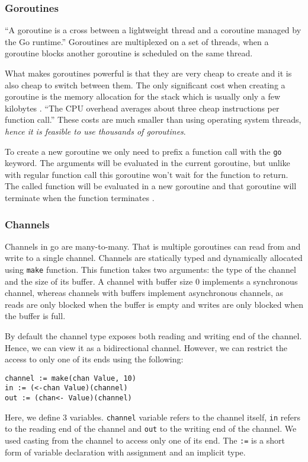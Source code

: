 \subsubsection{Goroutines}
``A goroutine is a cross between a lightweight thread and a coroutine
managed by the Go runtime.'' \cite[2]{whitehead} Goroutines are multiplexed
on a set of threads, when a goroutine blocks another goroutine is scheduled
on the same thread. 

What makes goroutines powerful is that they are very cheap to create and 
it is also cheap to switch between them. The only significant cost when 
creating a goroutine is the memory allocation for the stack which is 
usually only a few kilobytes \cite{FAQ}. ``The CPU overhead averages about 
three cheap instructions per function call.''\cite{FAQ} These costs are much 
smaller than using operating system threads, \textit{hence it is feasible to use 
thousands of goroutines}.

To create a new goroutine we only need to prefix a function call with
the \texttt{go} keyword. The arguments will be evaluated in the current
goroutine, but unlike with regular function call this goroutine won't
wait for the function to return. The called 
function will be evaluated in a new goroutine and that goroutine will 
terminate when the function terminates \cite{GoDocumentation}.

\subsubsection{Channels}
Channels in go are many-to-many. That is multiple goroutines can
read from and write to a single channel. Channels are statically typed and
dynamically allocated using \texttt{make} function. This function takes 
two arguments: the type of the channel and the size of its buffer.
A channel with buffer size 0 implements a synchronous channel, whereas 
channels with buffers implement asynchronous channels, as reads
are only blocked when the buffer is empty and writes are only blocked
when the buffer is full.

By default the channel type exposes both reading and writing end of the
channel. Hence, we can view it as a bidirectional channel. 
However, we can restrict the access to only one of its ends using the following:
\begin{lstlisting}
channel := make(chan Value, 10)
in := (<-chan Value)(channel)
out := (chan<- Value)(channel)
\end{lstlisting}
Here, we define 3 variables. \texttt{channel} variable refers to the 
channel itself, \texttt{in} refers to the reading end of the channel
and \texttt{out} to the writing end of the channel. We used casting
from the channel to access only one of its end. The \texttt{:=} is a
short form of variable declaration with assignment and an implicit type.

